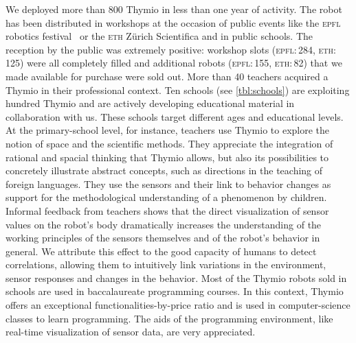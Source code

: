 \documentclass[letterpaper, 10 pt, conference]{ieeeconf}  %
\begin{document}
We deployed more than 800 Thymio in less than one year of activity.
The robot has been distributed in workshops at the occasion of public events like the \textsc{epfl} robotics festival~\cite{festival2011} or the \textsc{eth} Zürich Scientifica and in public schools.
The reception by the public was extremely positive: workshop slots (\textsc{epfl}:\,284, \textsc{eth}:\,125) were all completely filled and additional robots (\textsc{epfl}:\,155, \textsc{eth}:\,82) that we made available for purchase were sold out.
More than 40 teachers acquired a Thymio in their professional context.
Ten schools (see \ref{tbl:schools}) are exploiting hundred Thymio and are actively developing educational material in collaboration with us.
These schools target different ages and educational levels.
At the primary-school level, for instance, teachers use Thymio to explore the notion of space and the scientific methods.
They appreciate the integration of rational and spacial thinking that Thymio allows, but also its possibilities to concretely illustrate abstract concepts, such as directions in the teaching of foreign languages.
They use the sensors and their link to behavior changes as support for the methodological understanding of a phenomenon by children. %
Informal feedback from teachers shows that the direct visualization of sensor values on the robot's body dramatically increases the understanding of the working principles of the sensors themselves and of the robot's behavior in general. 
We attribute this effect to the good capacity of humans to detect correlations, allowing them to intuitively link variations in the environment, sensor responses and changes in the behavior. 
Most of the Thymio robots sold in schools are used in baccalaureate programming courses. 
In this context, Thymio offers an exceptional functionalities-by-price ratio and is used in computer-science classes to learn programming.
The aids of the programming environment, like real-time visualization of sensor data, are very appreciated.


\end{document}
